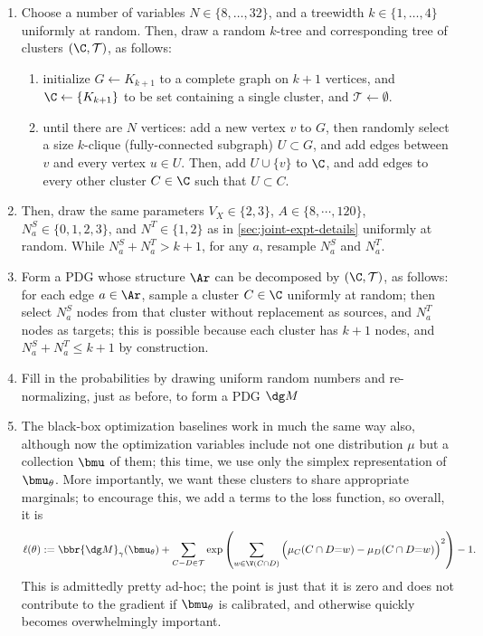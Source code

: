 
\begin{enumerate}
    \item Choose a number of variables $N \in \{ 8, \ldots, 32 \}$, and a treewidth $k \in \{1, \ldots, 4\}$ uniformly at random. 
    Then, draw a random $k$-tree and corresponding tree of clusters $(\C, \mathcal T)$, as follows:
    \begin{enumerate}
        \item initialize $G \gets K_{k+1}$ to a complete graph on $k+1$ vertices, and $\C \gets\{ K_{k+1} \}$ to be set containing a single cluster, and $\mathcal T\gets \emptyset$.
        \item until there are $N$ vertices: add a new vertex $v$ to $G$, then randomly select a size $k$-clique (fully-connected subgraph) $U \subset G$, and add edges between $v$ and every vertex $u \in U$.
        Then, add $U \cup \{v\}$ to $\C$, and add edges to every other cluster $C \in \C$ such that $U \subset C$.
    \end{enumerate}
    \item Then, draw the same parameters $V_X \in \{2,3\}$, $A \in \{8, \cdots, 120\}$, $N_a^S \in \{0,1,2,3\}$, and $N^{T}\in \{1,2\}$ 
    as in \cref{sec:joint-expt-details} uniformly at random.
    While $N_a^S + N^T_a > k+1$, for any $a$, resample $N_a^S$ and $N_a^T$.
    
    \item Form a PDG whose structure $\Ar$ can be decomposed by $(\C, \cal T)$, as follows: 
    for each edge $a \in \Ar$, sample a cluster $C \in \C$ uniformly at random; then select $N_a^S$ nodes from that cluster without replacement as sources, and $N_a^T$ nodes as targets; this is possible because each cluster has $k+1$ nodes, and $N_a^S + N_a^T \le k+1$ by construction.
    \item Fill in the probabilities by drawing uniform random numbers and re-normalizing, just as before, to form a PDG $\dg M$
    
    \item The black-box optimization baselines work in much the same way also, although now the optimization variables include not one distribution $\mu$ but a collection $\bmu$ of them; 
    this time, we use only the simplex representation of $\bmu_\theta$.
    More importantly, we want these clusters to share appropriate marginals; to encourage this, we add a terms to the loss function, so overall, it is
    \[
        \ell(\theta) := \bbr{\dg M}_{\gamma}(\bmu_{\theta}) + \sum_{C{-}D \in \mathcal T} \exp \left(\sum_{w \in \V(C\cap D)} \Big(\mu_C(C\cap D{=}w) - \mu_D(C \cap D {=}w)\Big)^2 \right) - 1.
    \]
    This is admittedly pretty ad-hoc; the point is just that it is zero and does not contribute to the gradient if $\bmu_\theta$ is calibrated, and otherwise quickly becomes overwhelmingly important.
\end{enumerate}

